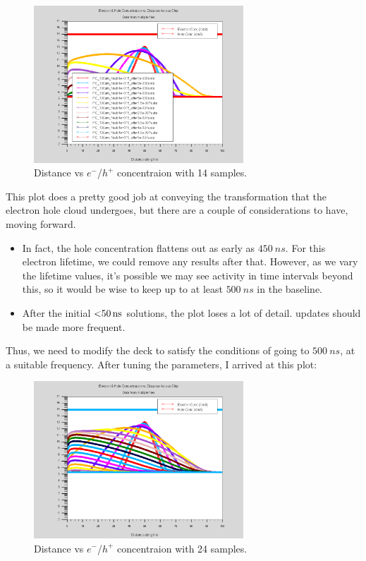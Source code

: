 \documentclass[12pt]{article}
\begin{document}
  \begin{figure}[H]
    \centering
    \includegraphics[width=0.7\textwidth]{n4n10}
    \caption{Distance vs $e^-$/$h^+$ concentraion with 14 samples.}
    \label{fig:n4n10}
  \end{figure}

  This plot does a pretty good job at conveying the transformation that the electron hole cloud undergoes, but there are a couple of considerations to have, moving forward.

  \begin{itemize}
    \item In fact, the hole concentration flattens out as early as $\SI{450}{ns}$. For this electron lifetime, we could remove any results after that. However, as we vary the lifetime values, it's possible we may see activity in time intervals beyond this, so it would be wise to keep up to at least $\SI{500}{ns}$ in the baseline.
    \item After the initial $\SI{<50}{ns}$ solutions, the plot loses a lot of detail. updates should be made more frequent.
  \end{itemize}

  Thus, we need to modify the deck to satisfy the conditions of going to $\SI{500}{ns}$, at a suitable frequency. After tuning the parameters, I arrived at this plot:

\begin{figure}[H]
  \centering
  \includegraphics[width=0.7\textwidth]{n4n20}
  \caption{Distance vs $e^-$/$h^+$ concentraion with 24 samples.}
  \label{fig:n4n20}
\end{figure}
\end{document}
